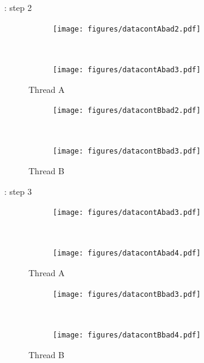 \documentclass{beamer}
\begin{document}
\begin{frame}{\insertsubsection : step 2}
\centering
\begin{minipage}{0.5\linewidth}
\begin{figure}[h]%
  \begin{subfigure}[b]{\linewidth}%
  \texttt{[image: figures/datacontAbad2.pdf]}
  \end{subfigure}\\
  \vspace{1cm}
  \begin{subfigure}[b]{\linewidth}%
  \texttt{[image: figures/datacontAbad3.pdf]}
  \end{subfigure}%
  \caption{Thread A}
\end{figure}%
\end{minipage}%
\begin{minipage}{0.5\linewidth}
\begin{figure}[h]%
  \begin{subfigure}[b]{\linewidth}%
  \texttt{[image: figures/datacontBbad2.pdf]}
  \end{subfigure}\\
  \vspace{1cm}
  \begin{subfigure}[b]{\linewidth}%
  \texttt{[image: figures/datacontBbad3.pdf]}
  \end{subfigure}%
  \caption{Thread B}
\end{figure}%
\end{minipage}
\end{frame}
\begin{frame}{\insertsubsection : step 3}
\centering
\begin{minipage}{0.5\linewidth}
\begin{figure}[h]%
  \begin{subfigure}[b]{\linewidth}%
  \texttt{[image: figures/datacontAbad3.pdf]}
  \end{subfigure}\\
  \vspace{1cm}
  \begin{subfigure}[b]{\linewidth}%
  \texttt{[image: figures/datacontAbad4.pdf]}
  \end{subfigure}%
  \caption{Thread A}
\end{figure}%
\end{minipage}%
\begin{minipage}{0.5\linewidth}
\begin{figure}[h]%
  \begin{subfigure}[b]{\linewidth}%
  \texttt{[image: figures/datacontBbad3.pdf]}
  \end{subfigure}\\
  \vspace{1cm}
  \begin{subfigure}[b]{\linewidth}%
  \texttt{[image: figures/datacontBbad4.pdf]}
  \end{subfigure}%
  \caption{Thread B}
\end{figure}%
\end{minipage}
\end{frame}
\end{document}
